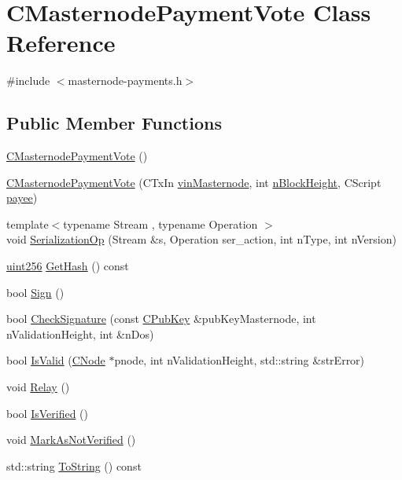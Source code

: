 \hypertarget{class_c_masternode_payment_vote}{}\section{C\+Masternode\+Payment\+Vote Class Reference}
\label{class_c_masternode_payment_vote}


{\ttfamily \#include $<$masternode-\/payments.\+h$>$}

\subsection*{Public Member Functions}
\begin{DoxyCompactItemize}
\item 
\mbox{\hyperlink{class_c_masternode_payment_vote_a91fe054a7e2c78e22bc4d9f3bc4651d1}{C\+Masternode\+Payment\+Vote}} ()
\item 
\mbox{\hyperlink{class_c_masternode_payment_vote_ab86247ae754fd4447d721786c3234049}{C\+Masternode\+Payment\+Vote}} (C\+Tx\+In \mbox{\hyperlink{class_c_masternode_payment_vote_a1a07779b769a2ca2b10267d61553df94}{vin\+Masternode}}, int \mbox{\hyperlink{class_c_masternode_payment_vote_ad75d093e53aa3e727a81aea841f4e26d}{n\+Block\+Height}}, C\+Script \mbox{\hyperlink{class_c_masternode_payment_vote_ab68f835feb0b7130296c642f526ce48b}{payee}})
\item 
{\footnotesize template$<$typename Stream , typename Operation $>$ }\\void \mbox{\hyperlink{class_c_masternode_payment_vote_a21c61547161e4de3a29b8ea80917926d}{Serialization\+Op}} (Stream \&s, Operation ser\+\_\+action, int n\+Type, int n\+Version)
\item 
\mbox{\hyperlink{classuint256}{uint256}} \mbox{\hyperlink{class_c_masternode_payment_vote_ac9dc15bcd8554151de83079ca0b65696}{Get\+Hash}} () const
\item 
bool \mbox{\hyperlink{class_c_masternode_payment_vote_a7e3cb1b9bbd3c03500facbea2a66de5d}{Sign}} ()
\item 
bool \mbox{\hyperlink{class_c_masternode_payment_vote_a07da3b083404cef1b60ed8b1305e4f0c}{Check\+Signature}} (const \mbox{\hyperlink{class_c_pub_key}{C\+Pub\+Key}} \&pub\+Key\+Masternode, int n\+Validation\+Height, int \&n\+Dos)
\item 
bool \mbox{\hyperlink{class_c_masternode_payment_vote_a3c03c7bb22e0e964deec6630d9e4086f}{Is\+Valid}} (\mbox{\hyperlink{class_c_node}{C\+Node}} $\ast$pnode, int n\+Validation\+Height, std\+::string \&str\+Error)
\item 
void \mbox{\hyperlink{class_c_masternode_payment_vote_a43f9f6fdf305480e2f35159348d6ff1d}{Relay}} ()
\item 
bool \mbox{\hyperlink{class_c_masternode_payment_vote_a4f228e9faf3d4a61fffb201bfb8007e5}{Is\+Verified}} ()
\item 
void \mbox{\hyperlink{class_c_masternode_payment_vote_a4b25b5a393ea2dc1cbc63e50a73eef56}{Mark\+As\+Not\+Verified}} ()
\item 
std\+::string \mbox{\hyperlink{class_c_masternode_payment_vote_a6b80e1a526e23a5745e3dc5f0dbbbdc5}{To\+String}} () const
\end{DoxyCompactItemize}
